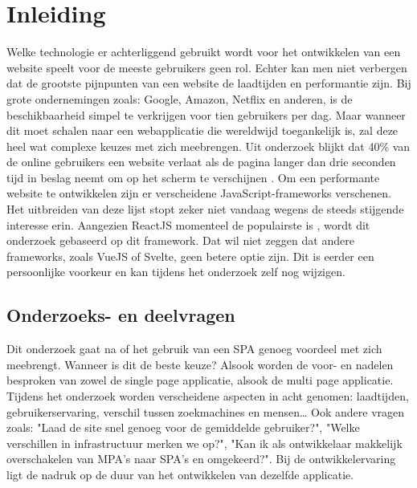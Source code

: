 \documentclass{hogent-article}
\affiliation{
  \textsuperscript{1} \href{mailto:jens.penneman@student.hogent.be}{jens.penneman@student.hogent.be}}
\begin{document}
\flushbottom
\maketitle
\tableofcontents
\thispagestyle{empty}


\section{Inleiding}
Welke technologie er achterliggend gebruikt wordt voor het ontwikkelen van een website speelt voor de meeste gebruikers geen rol.
Echter kan men niet verbergen dat de grootste pijnpunten van een website de laadtijden en performantie zijn.
Bij grote ondernemingen zoals: Google, Amazon, Netflix en anderen, is de beschikbaarheid simpel te verkrijgen voor tien gebruikers per dag.
Maar wanneer dit moet schalen naar een webapplicatie die wereldwijd toegankelijk is, zal deze heel wat complexe keuzes met zich meebrengen.
Uit onderzoek blijkt dat 40\% van de online gebruikers een website verlaat als de pagina langer dan drie seconden tijd in beslag neemt om op het scherm te verschijnen \autocite{LoadingSpeedWedevs2021}.
Om een performante website te ontwikkelen zijn er verscheidene JavaScript-frameworks verschenen. Het uitbreiden van deze lijst stopt zeker niet vandaag wegens de steeds stijgende interesse erin.
Aangezien ReactJS momenteel de populairste is \autocite{Gathoni2022}, wordt dit onderzoek gebaseerd op dit framework.
Dat wil niet zeggen dat andere frameworks, zoals VueJS of Svelte, geen betere optie zijn.
Dit is eerder een persoonlijke voorkeur en kan tijdens het onderzoek zelf nog wijzigen.

\subsection{Onderzoeks- en deelvragen}
Dit onderzoek gaat na of het gebruik van een SPA genoeg voordeel met zich meebrengt.
Wanneer is dit de beste keuze?
Alsook worden de voor- en nadelen besproken van zowel de single page applicatie, alsook de multi page applicatie.
Tijdens het onderzoek worden verscheidene aspecten in acht genomen:
laadtijden,
gebruikerservaring,
verschil tussen zoekmachines en mensen\dots
Ook andere vragen zoals:
"Laad de site snel genoeg voor de gemiddelde gebruiker?",
"Welke verschillen in infrastructuur merken we op?",
"Kan ik als ontwikkelaar makkelijk overschakelen van MPA's naar SPA's en omgekeerd?".
Bij de ontwikkelervaring ligt de nadruk op de duur van het ontwikkelen van dezelfde applicatie.
\end{document}
